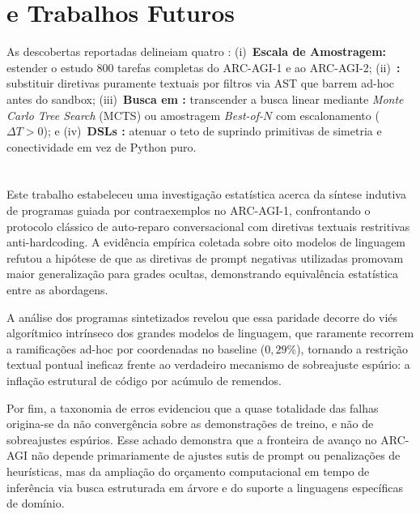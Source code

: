 \documentclass[letterpaper]{article} %
\begin{document}
\section{\Limitacoes{} e Trabalhos Futuros}
\label{sec:limitacoes}
As descobertas reportadas delineiam quatro \direcoes{} \prioritarias{}:
(i)~\textbf{Escala de Amostragem:} estender o estudo \as{} 800 tarefas completas do ARC-AGI-1 e ao ARC-AGI-2;
(ii)~\textbf{\Imposicao{}:} substituir diretivas puramente textuais por filtros \estaticos{} \rigidos{} via AST que barrem \ramificacoes{} ad-hoc antes do sandbox;
(iii)~\textbf{Busca em \Arvore{}:} transcender a busca linear \basica{} mediante \textit{Monte Carlo Tree Search} (MCTS) ou amostragem \textit{Best-of-$N$} com escalonamento \termico{} ($\Delta T > 0$); e
(iv)~\textbf{DSLs \Geometricas{}:} atenuar o teto de \representacao{} suprindo primitivas de simetria e conectividade \morfologica{} em vez de Python puro.

\section{\Conclusao{}}
\label{sec:conclusao}
Este trabalho estabeleceu uma investiga{\c{c}}{\~a}o estat{\'{i}}stica acerca da s{\'{i}}ntese indutiva de programas guiada por contraexemplos no ARC-AGI-1, confrontando o protocolo cl{\'{a}}ssico de auto-reparo conversacional com diretivas textuais restritivas anti-hardcoding. A evid{\^{e}}ncia emp{\'{i}}rica coletada sobre oito modelos de linguagem refutou a hip{\'{o}}tese de que as diretivas de prompt negativas utilizadas promovam maior generaliza{\c{c}}{\~a}o para grades ocultas, demonstrando equival{\^{e}}ncia estat{\'{i}}stica entre as abordagens.

A an{\'{a}}lise dos programas sintetizados revelou que essa paridade decorre do vi{\'{e}}s algor{\'{i}}tmico intr{\'{i}}nseco dos grandes modelos de linguagem, que raramente recorrem a ramifica{\c{c}}{\~o}es ad-hoc por coordenadas no baseline ($0{,}29\%$), tornando a restri{\c{c}}{\~a}o textual pontual ineficaz frente ao verdadeiro mecanismo de sobreajuste esp{\'{u}}rio: a infla{\c{c}}{\~a}o estrutural de c{\'{o}}digo por ac{\'{u}}mulo de remendos.

Por fim, a taxonomia de erros evidenciou que a quase totalidade das falhas origina-se da n{\~a}o converg{\^{e}}ncia sobre as demonstra{\c{c}}{\~o}es de treino, e n{\~a}o de sobreajustes esp{\'{u}}rios. Esse achado demonstra que a fronteira de avan{\c{c}}o no ARC-AGI n{\~a}o depende primariamente de ajustes sutis de prompt ou penaliza{\c{c}}{\~o}es de heur{\'{i}}sticas, mas da amplia{\c{c}}{\~a}o do or{\c{c}}amento computacional em tempo de infer{\^{e}}ncia via busca estruturada em {\'{a}}rvore e do suporte a linguagens espec{\'{i}}ficas de dom{\'{i}}nio.


\end{document}
